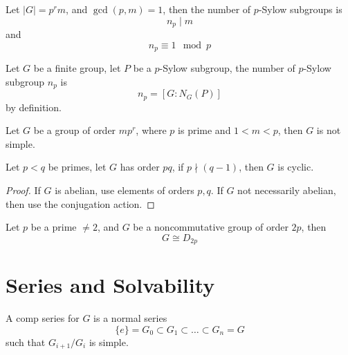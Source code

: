 \documentclass[openany]{book}
\begin{document}
\begin{thm}
    Let $|G|=p^rm$, and $\gcd(p,m)=1$, then the number of $p$-Sylow subgroups is 
    \begin{equation*}
        n_p\mid m 
    \end{equation*}
    and 
    \begin{equation*}
        n_p\equiv 1\mod p
    \end{equation*}
\end{thm}


\begin{thm}
    Let $G$ be a finite group, let $P$ be a $p$-Sylow subgroup, the number of $p$-Sylow subgroup $n_p$ is
    \begin{equation*}
        n_p=[G:N_G(P)]
    \end{equation*}
    by definition.
\end{thm}

\begin{thm}
    Let $G$ be a group of order $mp^r$, where $p$ is prime and $1<m<p$, then $G$ is not simple.
\end{thm}


\begin{thm}
    Let $p<q$ be primes, let $G$ has order $pq$, if $p\nmid (q-1)$, then $G$ is cyclic.
\end{thm}
\begin{proof}
    If $G$ is abelian, use elements of orders $p,q$. If $G$ not necessarily abelian, then use the conjugation action.
\end{proof}




\begin{thm}
    Let $p$ be a prime $\neq 2$, and $G$ be a noncommutative group of order $2p$, then 
    \begin{equation*}
        G\cong D_{2p}
    \end{equation*}
\end{thm}

\section{Series and Solvability}
\begin{defn}
    A comp series for $G$ is a normal series
    \begin{equation*}
        \{e\}=G_0\subset G_1\subset \dots\subset G_n=G
    \end{equation*}
    such that $G_{i+1}/G_i$ is simple.
\end{defn}
\end{document}
